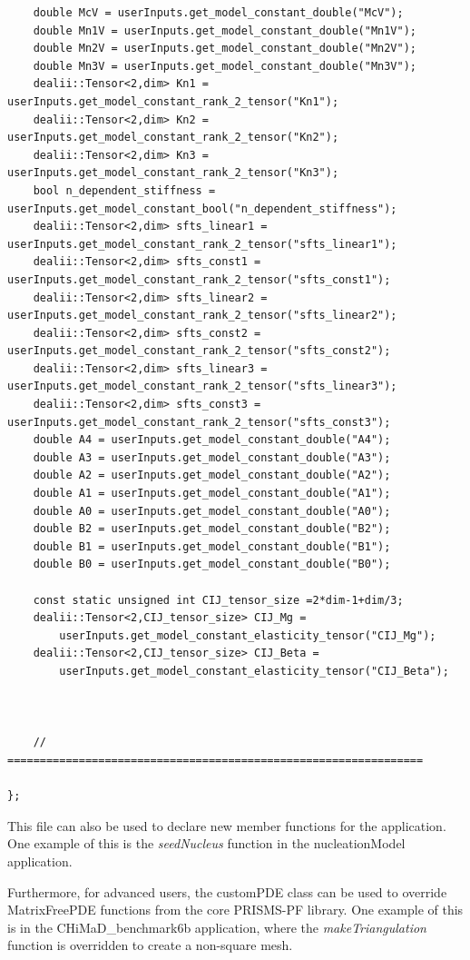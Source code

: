 \documentclass[10pt]{article} %
\begin{document}
\begin{lstlisting}
	double McV = userInputs.get_model_constant_double("McV");
	double Mn1V = userInputs.get_model_constant_double("Mn1V");
	double Mn2V = userInputs.get_model_constant_double("Mn2V");
	double Mn3V = userInputs.get_model_constant_double("Mn3V");
	dealii::Tensor<2,dim> Kn1 = userInputs.get_model_constant_rank_2_tensor("Kn1");
	dealii::Tensor<2,dim> Kn2 = userInputs.get_model_constant_rank_2_tensor("Kn2");
	dealii::Tensor<2,dim> Kn3 = userInputs.get_model_constant_rank_2_tensor("Kn3");
	bool n_dependent_stiffness = userInputs.get_model_constant_bool("n_dependent_stiffness");
	dealii::Tensor<2,dim> sfts_linear1 = userInputs.get_model_constant_rank_2_tensor("sfts_linear1");
	dealii::Tensor<2,dim> sfts_const1 = userInputs.get_model_constant_rank_2_tensor("sfts_const1");
	dealii::Tensor<2,dim> sfts_linear2 = userInputs.get_model_constant_rank_2_tensor("sfts_linear2");
	dealii::Tensor<2,dim> sfts_const2 = userInputs.get_model_constant_rank_2_tensor("sfts_const2");
	dealii::Tensor<2,dim> sfts_linear3 = userInputs.get_model_constant_rank_2_tensor("sfts_linear3");
	dealii::Tensor<2,dim> sfts_const3 = userInputs.get_model_constant_rank_2_tensor("sfts_const3");
	double A4 = userInputs.get_model_constant_double("A4");
	double A3 = userInputs.get_model_constant_double("A3");
	double A2 = userInputs.get_model_constant_double("A2");
	double A1 = userInputs.get_model_constant_double("A1");
	double A0 = userInputs.get_model_constant_double("A0");
	double B2 = userInputs.get_model_constant_double("B2");
	double B1 = userInputs.get_model_constant_double("B1");
	double B0 = userInputs.get_model_constant_double("B0");

	const static unsigned int CIJ_tensor_size =2*dim-1+dim/3;
	dealii::Tensor<2,CIJ_tensor_size> CIJ_Mg = 
		userInputs.get_model_constant_elasticity_tensor("CIJ_Mg");
	dealii::Tensor<2,CIJ_tensor_size> CIJ_Beta = 
		userInputs.get_model_constant_elasticity_tensor("CIJ_Beta");



	// ================================================================

};

\end{lstlisting}
\normalsize

This file can also be used to declare new member functions for the application. One example of this is the \emph{seedNucleus} function in the nucleationModel application.

Furthermore, for advanced users, the customPDE class can be used to override MatrixFreePDE functions from the core PRISMS-PF library. One example of this is in the CHiMaD\_benchmark6b application, where the \emph{makeTriangulation} function is overridden to create a non-square mesh.
\end{document}
